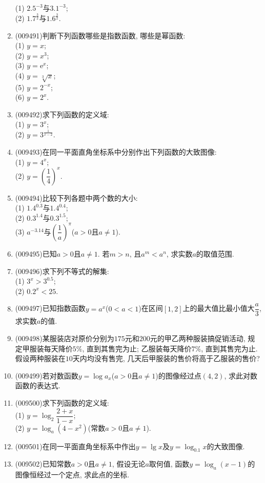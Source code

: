 \documentclass[10pt,a4paper]{article}
\begin{document}
\begin{enumerate}[1.]
(1) $2.5^{-3}$与$3.1^{-3}$;\\
(2) $1.7^{\frac 32}$与$1.6^{\frac 32}$.
\item {\tiny (009491)}判断下列函数哪些是指数函数, 哪些是幂函数:\\
(1) $y=x$;\\
(2) $y=x^3$;\\
(3) $y=\mathrm{e}^x$;\\
(4) $y=\sqrt[3]{x}$;\\
(5) $y=2^{-x}$;\\
(6) $y=2^x$.
\item {\tiny (009492)}求下列函数的定义域:\\
(1) $y=3^x$;\\
(2) $y=3^{\frac 1{x-2}}$.
\item {\tiny (009493)}在同一平面直角坐标系中分别作出下列函数的大致图像:\\
(1) $y=4^x$;\\
(2) $y=(\dfrac 14)^x$.
\item {\tiny (009494)}比较下列各题中两个数的大小:\\
(1) $1.4^{0.3}$与$1.4^{0.4}$;\\
(2) $0.3^{1.4}$与$0.3^{1.5}$;\\
(3) $a^{-3. 14}$与$(\dfrac 1a)^\pi$($a>0$且$a\ne 1$).
\item {\tiny (009495)}已知$a>0$且$a\ne 1$. 若$m>n$, 且$a^m<a^n$, 求实数$a$的取值范围.
\item {\tiny (009496)}求下列不等式的解集:\\
(1) $3^x>3^{0.5}$;\\
(2) $0.2^x<25$.
\item {\tiny (009497)}已知指数函数$y=a^x$($0<a<1$)在区间$[1, 2]$上的最大值比最小值大$\dfrac a3$, 求实数$a$的值.
\item {\tiny (009498)}某服装店对原价分别为$175$元和$200$元的甲乙两种服装搞促销活动, 规定甲服装每天降价$5\%$, 直到其售完为止; 乙服装每天降价$7\%$, 直到其售完为止. 假设两种服装在$10$天内均没有售完, 几天后甲服装的售价将高于乙服装的售价?
\item {\tiny (009499)}若对数函数$y=\log a_x$($a>0$且$a\ne 1$)的图像经过点$(4, 2)$, 求此对数函数的表达式.
\item {\tiny (009500)}求下列函数的定义域:\\
(1) $y=\log_2\dfrac{2+x}{1-x}$;\\
(2) $y=\log_a(4-x^2)$(常数$a>0$且$a\ne 1$).
\item {\tiny (009501)}在同一平面直角坐标系中作出$y=\lg x$及$y=\log_{0.1}x$的大致图像.
\item {\tiny (009502)}已知常数$a>0$且$a\ne 1$, 假设无论$a$取何值, 函数$y=\log_a(x-1)$的图像恒经过一个定点, 求此点的坐标.

\end{enumerate}
\end{document}
